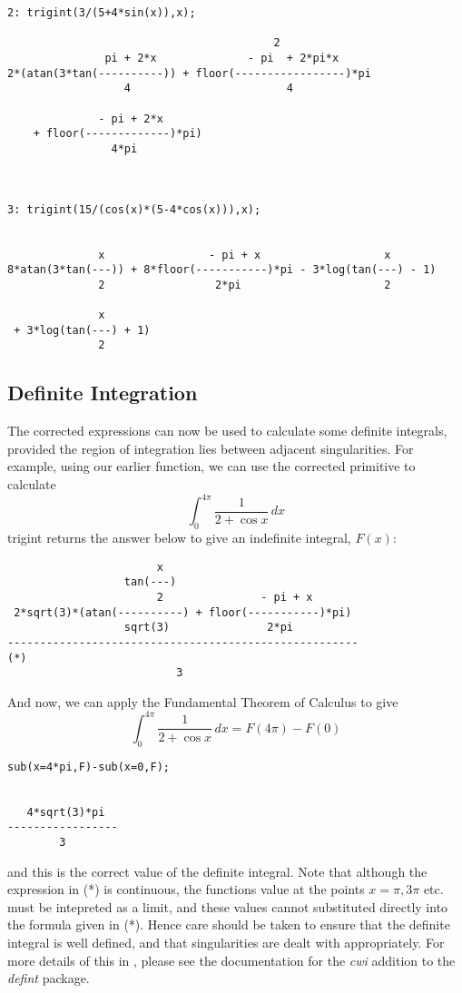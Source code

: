 \begin{verbatim}
2: trigint(3/(5+4*sin(x)),x);

                                         2
               pi + 2*x              - pi  + 2*pi*x
2*(atan(3*tan(----------)) + floor(-----------------)*pi
                  4                        4

              - pi + 2*x
    + floor(-------------)*pi)
                4*pi



3: trigint(15/(cos(x)*(5-4*cos(x))),x);


              x                - pi + x                   x
8*atan(3*tan(---)) + 8*floor(-----------)*pi - 3*log(tan(---) - 1)
              2                 2*pi                      2

              x
 + 3*log(tan(---) + 1)
              2
\end{verbatim}
\subsection{Definite Integration}
The corrected expressions can now be used to calculate some definite integrals, provided the region of integration lies between adjacent singularities. For example, using our earlier function, we can use the corrected primitive to calculate
     \begin{equation} \int_{0}^{4\pi} \frac{1}{2+\cos x}\,dx \end{equation}
trigint returns the answer below to give an indefinite integral, $F(x)$:
\begin{verbatim}
                       x
                  tan(---)
                       2               - pi + x
 2*sqrt(3)*(atan(----------) + floor(-----------)*pi)
                  sqrt(3)               2*pi
------------------------------------------------------                   (*)
                          3
\end{verbatim}
And now, we can apply the Fundamental Theorem of Calculus to give
 \begin{equation} \int_{0}^{4\pi} \frac{1}{2+\cos x}\,dx = F(4\pi)-F(0) \end{equation}
\begin{verbatim}
sub(x=4*pi,F)-sub(x=0,F);


   4*sqrt(3)*pi
-----------------
        3
\end{verbatim}
and this is the correct value of the definite integral.
Note that although the expression in (*) is continuous, the functions value at the points $x=\pi,3\pi$ etc. must be intepreted as a limit, and these values cannot substituted directly into the formula given in (*). Hence care should be taken to ensure that the definite integral is well defined, and that singularities are dealt with appropriately. For more details of this in \REDUCE, please see the documentation for the \emph{cwi} addition to the \emph{defint} package.

